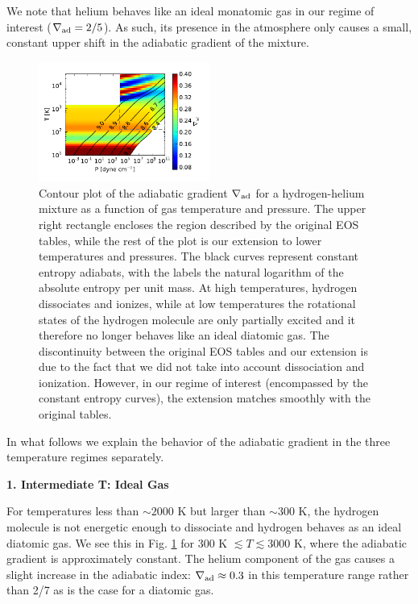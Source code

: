 \documentclass[apj]{emulateapj}
\newcommand{\delad}{\nabla_{\rm ad}}
\begin{document}
We note that helium behaves like an ideal monatomic gas in our regime of interest ($\delad=2/5$). As such, its presence in the atmosphere only causes a small, constant upper shift in the adiabatic gradient of the mixture.

\begin{figure}[h]
\centering
\includegraphics[width=0.5\textwidth]{../../figs/ModelAtmospheres/RadSelfGravRealEOS/PaperFigs/delad_S_mixt.pdf}
\caption{Contour plot of the adiabatic gradient $\delad$ for a hydrogen-helium mixture as a function of gas temperature and pressure. The upper right rectangle encloses the region described by the original \citet{saumon95} EOS tables, while the rest of the plot is our extension to lower temperatures and pressures. The black curves represent constant entropy adiabats, with the labels the natural logarithm of the absolute entropy per unit mass. At high temperatures, hydrogen dissociates and ionizes, while at low temperatures the rotational states of the hydrogen molecule are only partially excited and it therefore no longer behaves like an ideal diatomic gas. The discontinuity between the original EOS tables and our extension is due to the fact that we did not take into account dissociation and ionization. However, in our regime of interest (encompassed by the constant entropy curves), the extension matches smoothly with the original tables.}
\label{fig:deladmap}
\end{figure}

In what follows we explain the behavior of the adiabatic gradient in the three temperature regimes separately.

\vspace{0.2in}

\textbf{1. Intermediate T: Ideal Gas}

For temperatures less than $\sim 2000$ K but larger than $\sim 300$ K, the hydrogen molecule is not energetic enough to dissociate and hydrogen behaves as an ideal diatomic gas. We see this in Fig. \ref{fig:deladmap} for 300 K $\lesssim T \lesssim 3000$ K, where the adiabatic gradient is approximately constant. The helium component of the gas causes a slight increase in the adiabatic index: $\delad \approx 0.3$ in this temperature range rather than 2/7 as is the case for a diatomic gas.
\end{document}

